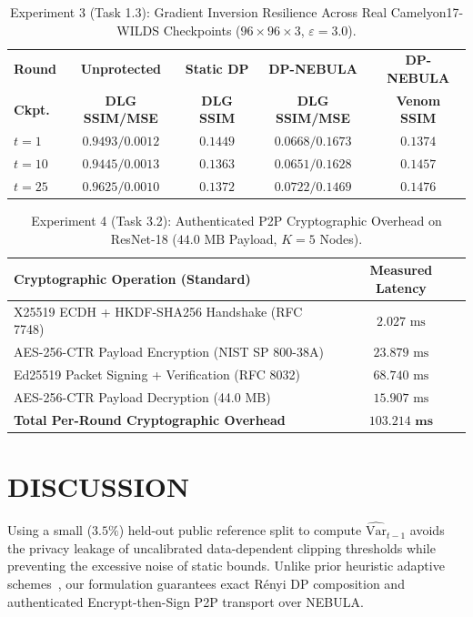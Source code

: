 \documentclass{ieeeaccess}
\begin{document}
\begin{table}[!t]
\centering
\caption{Experiment 3 (Task 1.3): Gradient Inversion Resilience Across Real Camelyon17-WILDS Checkpoints ($96 \times 96 \times 3$, $\varepsilon=3.0$).}
\label{tab:checkpoints}
\begin{tabular}{lcccc}
\toprule
\textbf{Round} & \textbf{Unprotected} & \textbf{Static DP} & \textbf{DP-NEBULA} & \textbf{DP-NEBULA} \\
\textbf{Ckpt.} & \textbf{DLG SSIM/MSE} & \textbf{DLG SSIM} & \textbf{DLG SSIM/MSE} & \textbf{Venom SSIM} \\
\midrule
$t = 1$  & $0.9493 / 0.0012$ & $0.1449$ & $\mathbf{0.0668 / 0.1673}$ & $\mathbf{0.1374}$ \\
$t = 10$ & $0.9445 / 0.0013$ & $0.1363$ & $\mathbf{0.0651 / 0.1628}$ & $\mathbf{0.1457}$ \\
$t = 25$ & $0.9625 / 0.0010$ & $0.1372$ & $\mathbf{0.0722 / 0.1469}$ & $\mathbf{0.1476}$ \\
\bottomrule
\end{tabular}
\end{table}

\begin{table}[!t]
\centering
\caption{Experiment 4 (Task 3.2): Authenticated P2P Cryptographic Overhead on ResNet-18 ($44.0\text{ MB}$ Payload, $K=5$ Nodes).}
\label{tab:crypto_overhead}
\begin{tabular}{lc}
\toprule
\textbf{Cryptographic Operation (Standard)} & \textbf{Measured Latency} \\
\midrule
X25519 ECDH + HKDF-SHA256 Handshake (RFC 7748) & $2.027\text{ ms}$ \\
AES-256-CTR Payload Encryption (NIST SP 800-38A) & $23.879\text{ ms}$ \\
Ed25519 Packet Signing + Verification (RFC 8032) & $68.740\text{ ms}$ \\
AES-256-CTR Payload Decryption (44.0 MB) & $15.907\text{ ms}$ \\
\midrule
\textbf{Total Per-Round Cryptographic Overhead} & $\mathbf{103.214\text{ ms}}$ \\
\bottomrule
\end{tabular}
\end{table}

\section{DISCUSSION}
Using a small ($3.5\%$) held-out public reference split to compute $\widehat{\text{Var}}_{t-1}$ avoids the privacy leakage of uncalibrated data-dependent clipping thresholds while preventing the excessive noise of static bounds. Unlike prior heuristic adaptive schemes~\cite{ref12,ref13}, our formulation guarantees exact R\'enyi DP composition and authenticated Encrypt-then-Sign P2P transport over NEBULA.
\end{document}
